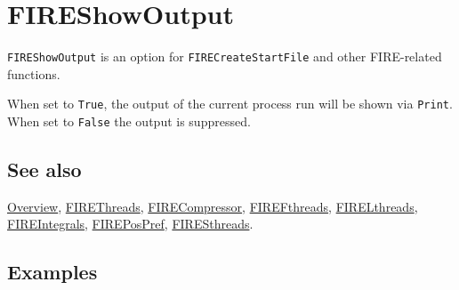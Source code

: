 \documentclass[../FeynHelpersManual.tex]{subfiles}
\begin{document}
\begin{Shaded}
\begin{Highlighting}[]
 
\end{Highlighting}
\end{Shaded}

\hypertarget{fireshowoutput}{
\section{FIREShowOutput}\label{fireshowoutput}}

\texttt{FIREShowOutput} is an option for \texttt{FIRECreateStartFile}
and other FIRE-related functions.

When set to \texttt{True}, the output of the current process run will be
shown via \texttt{Print}. When set to \texttt{False} the output is
suppressed.

\subsection{See also}

\hyperlink{toc}{Overview}, \hyperlink{firethreads}{FIREThreads},
\hyperlink{firecompressor}{FIRECompressor},
\hyperlink{firefthreads}{FIREFthreads},
\hyperlink{firelthreads}{FIRELthreads},
\hyperlink{fireintegrals}{FIREIntegrals},
\hyperlink{firepospref}{FIREPosPref},
\hyperlink{firesthreads}{FIRESthreads}.

\subsection{Examples}
\end{document}
